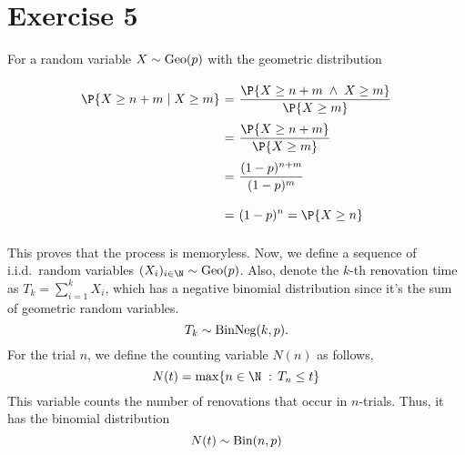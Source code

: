 \section{Exercise 5}

For a random variable $X\sim \hbox{Geo}(p)$ with the geometric distribution
\[ \everymath{\displaystyle}
\arraycolsep=1.8pt\def\arraystretch{2.5}
\begin{array}{rcl}
    \P\{X \geq n+m \;|\; X \geq m\} & = & \frac{ \P\{X \geq n+m \;\land\; X \geq m\}}{ \P\{X \geq m\}}\\
    & = & \frac{ \P\{X \geq n+m\} }{ \P\{X \geq m\}}\\
    & = & \frac{(1-p)^{n+m}}{(1-p)^m}\\
    & = & (1-p)^n= \P\{X \geq n\} \\
\end{array} \]

This proves that the process is memoryless. Now, we define a sequence of i.i.d.~random variables $(X_i)_{i\in\N} \sim \hbox{Geo}(p)$. Also, denote the $k$-th renovation time as $T_k = \sum_{i = 1}^{k} X_i$, which has a negative binomial distribution since it's the sum of geometric random variables.
\[ T_k \sim \hbox{BinNeg}(k,p). \]
For the trial $n$, we define the counting variable $N(n)$ as follows,
\[ N(t) = \max\{n\in\N \;:\, T_n \leq t\} \]
This variable counts the number of renovations that occur in $n$-trials. Thus, it has the binomial distribution
\[ N(t) \sim \hbox{Bin}(n,p) \]